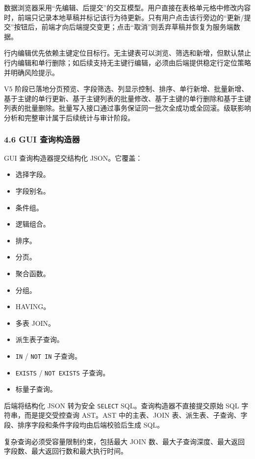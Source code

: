 \documentclass[
  a4paper,
  UTF8]{ctexart}
\providecommand{\tightlist}{%
  \setlength{\itemsep}{0pt}\setlength{\parskip}{0pt}}
\begin{document}
数据浏览器采用``先编辑、后提交''的交互模型。用户直接在表格单元格中修改内容时，前端只记录本地草稿并标记该行为待更新。只有用户点击该行旁边的``更新/提交''按钮后，前端才向后端提交变更；点击``取消''则丢弃草稿并恢复为服务端数据。

行内编辑优先依赖主键定位目标行。无主键表可以浏览、筛选和新增，但默认禁止行内编辑和单行删除；如后续支持无主键行编辑，必须由后端提供稳定行定位策略并明确风险提示。

V5
阶段已落地分页预览、字段筛选、列显示控制、排序、单行新增、批量新增、基于主键的单行更新、基于主键列表的批量修改、基于主键的单行删除和基于主键列表的批量删除。批量写入接口通过事务保证同一批次全成功或全回滚。级联影响分析和完整审计属于后续统计与审计阶段。

\hypertarget{gui-ux67e5ux8be2ux6784ux9020ux5668}{%
\subsubsection{4.6 GUI
查询构造器}\label{gui-ux67e5ux8be2ux6784ux9020ux5668}}

GUI 查询构造器提交结构化 JSON。它覆盖：

\begin{itemize}
\tightlist
\item
  选择字段。
\item
  字段别名。
\item
  条件组。
\item
  逻辑组合。
\item
  排序。
\item
  分页。
\item
  聚合函数。
\item
  分组。
\item
  HAVING。
\item
  多表 JOIN。
\item
  派生表子查询。
\item
  \texttt{IN} / \texttt{NOT\ IN} 子查询。
\item
  \texttt{EXISTS} / \texttt{NOT\ EXISTS} 子查询。
\item
  标量子查询。
\end{itemize}

后端将结构化 JSON 转为安全 \texttt{SELECT} SQL。查询构造器不直接提交原始
SQL 字符串，而是提交受控查询 AST。AST 中的主表、JOIN
表、派生表、子查询、字段、排序字段和条件字段均由后端校验后生成 SQL。

复杂查询必须受容量限制约束，包括最大 JOIN
数、最大子查询深度、最大返回字段数、最大返回行数和最大执行时间。
\end{document}
